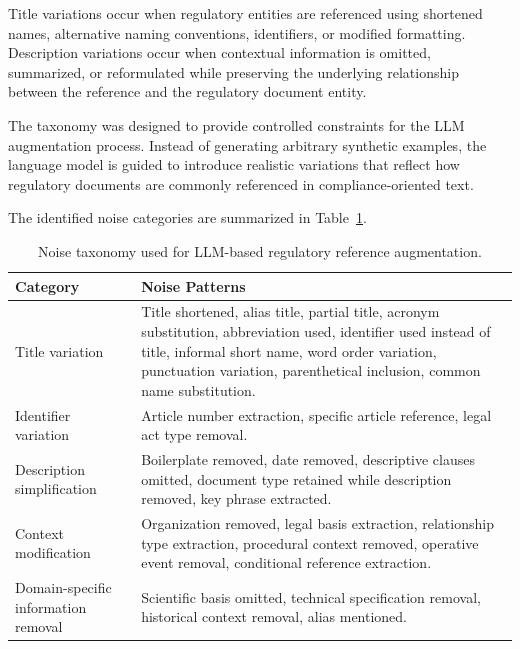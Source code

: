 Title variations occur when regulatory entities are referenced using shortened names, alternative naming conventions, identifiers, or modified formatting. Description variations occur when contextual information is omitted, summarized, or reformulated while preserving the underlying relationship between the reference and the regulatory document entity.

The taxonomy was designed to provide controlled constraints for the LLM augmentation process. Instead of generating arbitrary synthetic examples, the language model is guided to introduce realistic variations that reflect how regulatory documents are commonly referenced in compliance-oriented text.

The identified noise categories are summarized in Table~\ref{tab:noise_taxonomy}.

\begin{table}[H]
\centering
\caption{Noise taxonomy used for LLM-based regulatory reference augmentation.}
\label{tab:noise_taxonomy}
\begin{tabular}{p{3.5cm}p{10cm}}
\hline
\textbf{Category} & \textbf{Noise Patterns} \\
\hline

Title variation &
Title shortened, alias title, partial title, acronym substitution, abbreviation used, identifier used instead of title, informal short name, word order variation, punctuation variation, parenthetical inclusion, common name substitution.
\\[0.3cm]

Identifier variation &
Article number extraction, specific article reference, legal act type removal.
\\[0.3cm]

Description simplification &
Boilerplate removed, date removed, descriptive clauses omitted, document type retained while description removed, key phrase extracted.
\\[0.3cm]

Context modification &
Organization removed, legal basis extraction, relationship type extraction, procedural context removed, operative event removal, conditional reference extraction.
\\[0.3cm]

Domain-specific information removal &
Scientific basis omitted, technical specification removal, historical context removal, alias mentioned.
\\

\hline
\end{tabular}
\end{table}


